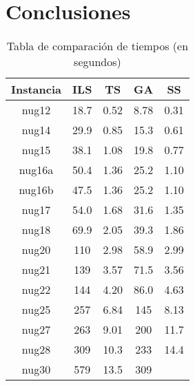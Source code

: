 \documentclass{ci5652}
\begin{document}
\section*{Conclusiones}

\begin{table}[ht]
\centering
\caption{Tabla de comparación de tiempos (en segundos)}
\label{my-label}
\begin{tabular}{|c|c|c|c|c|}
\hline
{\bf Instancia} & {\bf ILS} & {\bf TS} & {\bf GA} & {\bf SS} \\ \hline
nug12           & 18.7      & 0.52     & 8.78     & 0.31     \\ \hline
nug14           & 29.9      & 0.85     & 15.3     & 0.61     \\ \hline
nug15           & 38.1      & 1.08     & 19.8     & 0.77     \\ \hline
nug16a          & 50.4      & 1.36     & 25.2     & 1.10     \\ \hline
nug16b          & 47.5      & 1.36     & 25.2     & 1.10     \\ \hline
nug17           & 54.0      & 1.68     & 31.6     & 1.35     \\ \hline
nug18           & 69.9      & 2.05     & 39.3     & 1.86     \\ \hline
nug20           & 110       & 2.98     & 58.9     & 2.99     \\ \hline
nug21           & 139       & 3.57     & 71.5     & 3.56     \\ \hline
nug22           & 144       & 4.20     & 86.0     & 4.63     \\ \hline
nug25           & 257       & 6.84     & 145      & 8.13     \\ \hline
nug27           & 263       & 9.01     & 200      & 11.7     \\ \hline
nug28           & 309       & 10.3     & 233      & 14.4     \\ \hline
nug30           & 579       & 13.5     & 309      &          \\ \hline
\end{tabular}
\end{table}


%


\small

\end{document}
